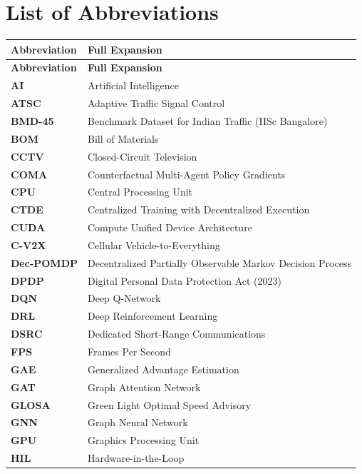 \documentclass[12pt,a4paper,oneside]{report}
\begin{document}
\chapter*{List of Abbreviations}

\begin{longtable}{p{3.0cm} p{11.5cm}}
\toprule
\textbf{Abbreviation} & \textbf{Full Expansion} \\
\midrule
\endfirsthead
\toprule
\textbf{Abbreviation} & \textbf{Full Expansion} \\
\midrule
\endhead
\bottomrule
\endfoot
\textbf{AI} & Artificial Intelligence \\
\textbf{ATSC} & Adaptive Traffic Signal Control \\
\textbf{BMD-45} & Benchmark Dataset for Indian Traffic (IISc Bangalore) \\
\textbf{BOM} & Bill of Materials \\
\textbf{CCTV} & Closed-Circuit Television \\
\textbf{COMA} & Counterfactual Multi-Agent Policy Gradients \\
\textbf{CPU} & Central Processing Unit \\
\textbf{CTDE} & Centralized Training with Decentralized Execution \\
\textbf{CUDA} & Compute Unified Device Architecture \\
\textbf{C-V2X} & Cellular Vehicle-to-Everything \\
\textbf{Dec-POMDP} & Decentralized Partially Observable Markov Decision Process \\
\textbf{DPDP} & Digital Personal Data Protection Act (2023) \\
\textbf{DQN} & Deep Q-Network \\
\textbf{DRL} & Deep Reinforcement Learning \\
\textbf{DSRC} & Dedicated Short-Range Communications \\
\textbf{FPS} & Frames Per Second \\
\textbf{GAE} & Generalized Advantage Estimation \\
\textbf{GAT} & Graph Attention Network \\
\textbf{GLOSA} & Green Light Optimal Speed Advisory \\
\textbf{GNN} & Graph Neural Network \\
\textbf{GPU} & Graphics Processing Unit \\
\textbf{HIL} & Hardware-in-the-Loop \\

\end{longtable}
\end{document}
